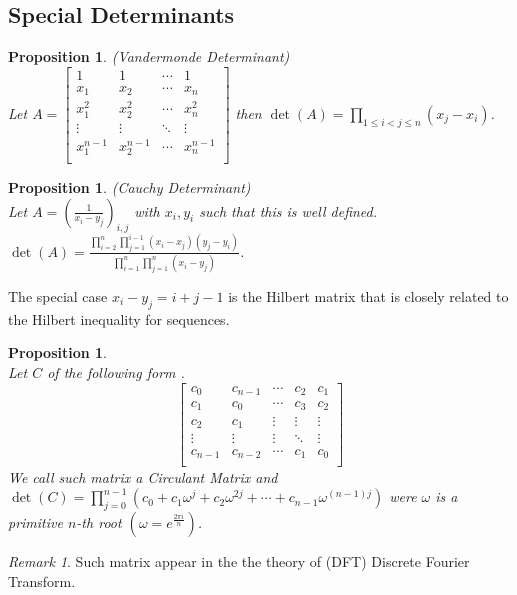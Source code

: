 \documentclass[12pt]{article}
\newtheorem{prop}[theorem]{Proposition}
\theoremstyle{definition}
\theoremstyle{remark}
\newtheorem*{remark}{Remark}
\theoremstyle{plain}
\begin{document}
\subsection{Special Determinants}

\begin{prop}\textup{(Vandermonde Determinant)} \\
Let $A=\begin{bmatrix}
	1 & 1 &\cdots & 1 \\
	x_1 & x_2 & \cdots & x_n\\ 
	x_1^2 & x_2^2 & \cdots & x_n^2 \\ 
	\vdots & \vdots & \ddots & \vdots \\ 
	x_1^{n-1} & x_2^{n-1}& \cdots & x_n^{n-1}\\
\end{bmatrix}$ then $\det(A)=\prod\limits_{1\leq i < j \leq n} (x_j-x_i)$.
\end{prop}
\begin{prop}\textup{(Cauchy Determinant)} \\ 
    Let $A=(\frac{1}{x_i-y_j})_{i,j}$ with $x_i,y_i$ such that this is well defined.\\
    $\det(A)=\frac{\prod\limits_{i=2}^n\prod\limits_{j=1}^{i-1}(x_i-x_j)(y_j-y_i)}{\prod\limits_{i=1}^n\prod\limits_{j=1}^n(x_i-y_j)}$.
\end{prop}
The special case $x_i-y_j=i+j-1$ is the Hilbert matrix that is closely related to the Hilbert inequality for sequences.
\begin{prop}\leavevmode \\
Let $C$ of the following form .\[
	\begin{bmatrix}
		c_0 & c_{n-1} & \cdots & c_2 & c_1\\
		c_1 & c_0 & \cdots & c_3 & c_2\\
		c_2 & c_1 &\vdots &\vdots & \vdots\\
		\vdots & \vdots & \vdots & \ddots & \vdots \\
		c_{n-1} & c_{n-2} & \cdots & c_1 & c_0\\
	\end{bmatrix}
\]
We call such matrix a \textit{Circulant Matrix} and $\det(C)=\prod\limits_{j=0}^{n-1}(c_0+c_1 \omega^j+c_2 \omega^{2j}+ \cdots +c_{n-1}\omega^{(n-1)j})$ were $\omega$ is a primitive $n$-th root $(\omega=e^{\frac{2\pi i}{n}})$.
\end{prop}
\begin{remark}
    Such matrix appear in the the theory of (DFT) Discrete Fourier Transform.
\end{remark}
\newpage
\end{document}
